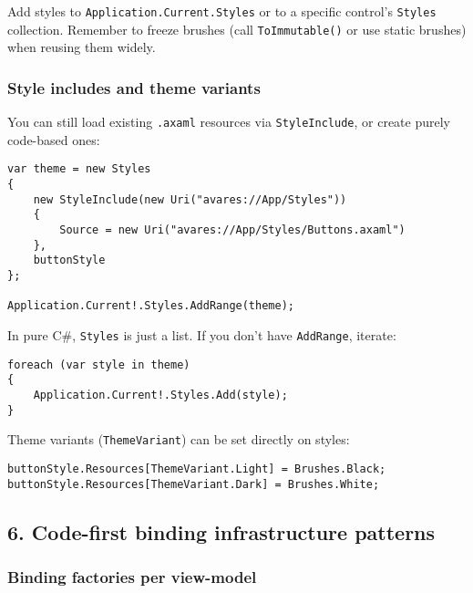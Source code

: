 Add styles to \passthrough{\lstinline!Application.Current.Styles!} or to
a specific control's \passthrough{\lstinline!Styles!} collection.
Remember to freeze brushes (call \passthrough{\lstinline!ToImmutable()!}
or use static brushes) when reusing them widely.

\subsubsection{Style includes and theme
variants}\label{style-includes-and-theme-variants}

You can still load existing \passthrough{\lstinline!.axaml!} resources
via \passthrough{\lstinline!StyleInclude!}, or create purely code-based
ones:

\begin{lstlisting}
var theme = new Styles
{
    new StyleInclude(new Uri("avares://App/Styles"))
    {
        Source = new Uri("avares://App/Styles/Buttons.axaml")
    },
    buttonStyle
};

Application.Current!.Styles.AddRange(theme);
\end{lstlisting}

In pure C\#, \passthrough{\lstinline!Styles!} is just a list. If you
don't have \passthrough{\lstinline!AddRange!}, iterate:

\begin{lstlisting}
foreach (var style in theme)
{
    Application.Current!.Styles.Add(style);
}
\end{lstlisting}

Theme variants (\passthrough{\lstinline!ThemeVariant!}) can be set
directly on styles:

\begin{lstlisting}
buttonStyle.Resources[ThemeVariant.Light] = Brushes.Black;
buttonStyle.Resources[ThemeVariant.Dark] = Brushes.White;
\end{lstlisting}

\subsection{6. Code-first binding infrastructure
patterns}\label{code-first-binding-infrastructure-patterns}

\subsubsection{Binding factories per
view-model}\label{binding-factories-per-view-model}

